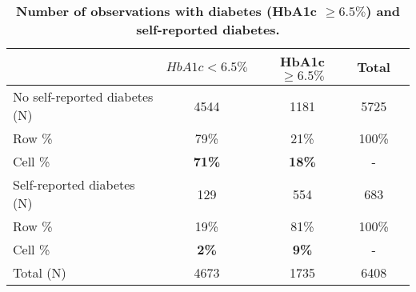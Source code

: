 \documentclass[10pt,letterpaper]{article}
\begin{document}
\begin{table}[!ht]
	\caption{\label{tab:Biomarker_observations}{\bf Number of observations with diabetes (HbA1c $\geq 6.5\%$) and self-reported diabetes.}}
	\begin{center}
		\begin{adjustbox}{max width=\linewidth}
			\begin{threeparttable}
				{
					\def\sym#1{\ifmmode^{#1}\else\(^{#1}\)\fi}
					\begin{tabular}{lcccc}
						\toprule
						&\multicolumn{1}{c}{$HbA1c < 6.5\%$}&\multicolumn{1}{c}{HbA1c $\geq 6.5\%$}&\multicolumn{1}{c}{Total}\\
						\midrule
						No self-reported diabetes (N) & 4544 & 1181 & 5725 &  \\
						\hspace*{10mm}Row  \% & 79\% & 21\% & 100\% &  \\
						\hspace*{10mm}Cell \% & \textbf{71\%} & \textbf{18\%} & - & \\
						Self-reported diabetes (N) & 129 & 554 & 683 &  \\
						\hspace*{10mm}Row \%  & 19\% & 81\% & 100\% &  \\
						\hspace*{10mm}Cell \% & \textbf{2\%} &\textbf{9\%} &- & \\
						Total (N) & 4673 & 1735 & 6408 &  \\ 
						\bottomrule
					\end{tabular}
					\begin{tablenotes}
						\item
					\end{tablenotes}
				}
			\end{threeparttable}
		\end{adjustbox}
	\end{center}
\end{table}
\end{document}
